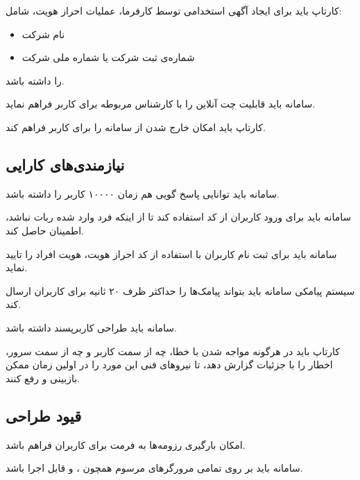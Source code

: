 \documentclass[12pt,svgnames,oneside]{book}
\newcounter{itemadded}
\newcommand{\addeditem}{%
	\addtocounter{enumi}{-1}%
	\stepcounter{itemadded}
	\let\LaTeXStandardLabelEnumi\labelenumi%
	\addtocounter{enumi}{1}
	\renewcommand{\labelenumi}{\arabic{enumi}\lr{R}.}%
	\item 
	\let\labelenumi\LaTeXStandardLabelEnumi%
}%
\let\LaTeXStandardEnumerateBegin\enumerate
\let\LaTeXStandardEnumerateEnd\endenumerate
\renewenvironment{enumerate}{%
	\LaTeXStandardEnumerateBegin%
	\setcounter{itemadded}{0}
}{%
	\LaTeXStandardEnumerateEnd%
}%
\begin{document}
\begin{enumerate}
							\addeditem
							کارتاپ باید برای ایجاد آگهی استخدامی توسط کارفرما، عملیات احراز هویت، شامل: \label{24}
							\begin{itemize}
								\item نام شرکت
								\item شماره‌ی ثبت شرکت یا شماره ملی شرکت
							\end{itemize}
							را داشته باشد.

							\addeditem
					سامانه باید قابلیت چت آنلاین را با کارشناس مربوطه برای کاربر فراهم نماید. \label{25}
							\addeditem
							کارتاپ باید امکان خارج شدن از سامانه را برای کاربر فراهم کند. \label{28}
							
				\end{enumerate}
			\subsection{نیازمندی‌های کارایی}
				\begin{enumerate}
					\item
					سامانه باید توانایی پاسخ گویی هم زمان ۱۰۰۰۰ کاربر را داشته باشد.
					\item
					سامانه باید برای ورود کاربران از کد \lr{CAPCHA}  استفاده کند تا از اینکه فرد وارد شده ربات نباشد، اطمینان حاصل کند.
					\item
					سامانه باید برای ثبت نام کاربران با استفاده از کد احراز هویت، هویت افراد را تایید نماید.
					\item
					سیستم پیامکی سامانه باید بتواند پیامک‌ها را حداکثر ظرف ۲۰ ثانیه برای کاربران ارسال کند.
					\item
					سامانه باید طراحی کاربرپسند داشته باشد.
					\item
					کارتاپ باید در هرگونه مواجه شدن با خطا، چه از سمت کاربر و چه از سمت سرور، اخطار را با جزئیات گزارش دهد، تا نیروهای فنی این مورد را در اولین زمان ممکن بازبینی و رفع کنند.
				\end{enumerate}
			\subsection{قیود طراحی}
			\begin{enumerate}
				\item
				امکان بارگیری رزومه‌ها به فرمت  برای کاربران فراهم باشد.
				\item
				سامانه باید بر روی تمامی مرورگر‌های مرسوم همچون
				،
				 و
				  قابل اجرا باشد.
			\end{enumerate}
\end{document}

